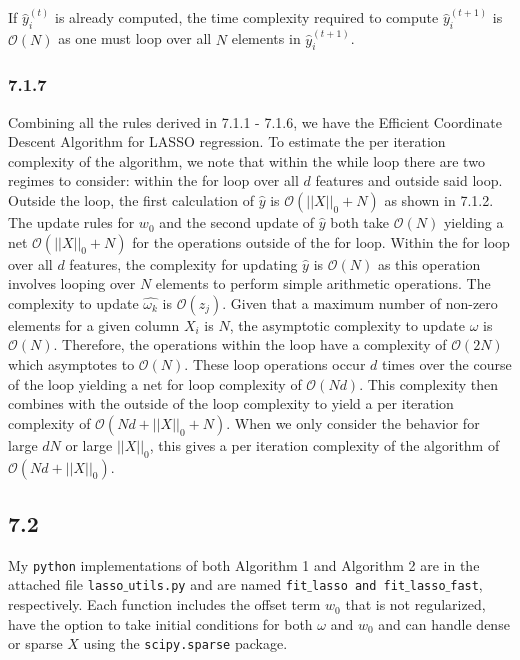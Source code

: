 \documentclass[12pt]{amsart}
\begin{document}
If $\hat{y}_i^{(t)}$ is already computed, the time complexity required to compute $\hat{y}_i^{(t+1)}$ is $\mathcal{O}(N)$ as one must loop over all $N$ elements in $\hat{y}_i^{(t+1)}$.

\subsubsection*{7.1.7}

Combining all the rules derived in 7.1.1 - 7.1.6, we have the Efficient Coordinate Descent Algorithm for LASSO regression.  To estimate the per iteration complexity of the algorithm, we note that within the while loop there are two regimes to consider: within the for loop over all $d$ features and outside said loop.  Outside the loop, the first calculation of $\hat{y}$ is $\mathcal{O}(||X||_0 + N)$ as shown in 7.1.2.  The update rules for $w_0$ and the second update of $\hat{y}$ both take $\mathcal{O}(N)$ yielding a net $\mathcal{O}(||X||_0 + N)$ for the operations outside of the for loop.  Within the for loop over all $d$ features, the complexity for updating $\hat{y}$ is $\mathcal{O}(N)$ as this operation involves looping over $N$ elements to perform simple arithmetic operations.  The complexity to update $\hat{\omega_k}$ is $\mathcal{O}(z_j)$.  Given that a maximum number of non-zero elements for a given column $X_i$ is $N$, the asymptotic complexity to update $\hat{\omega}$ is $\mathcal{O}(N)$.  Therefore, the operations within the loop have a complexity of $\mathcal{O}(2N)$ which asymptotes to $\mathcal{O}(N)$.  These loop operations occur $d$ times over the course of the loop yielding a net for loop complexity of $\mathcal{O}(Nd)$.  This complexity then combines with the outside of the loop complexity to yield a per iteration complexity of $\mathcal{O}(Nd + ||X||_0 + N)$.  When we only consider the behavior for large $dN$ or large $||X||_0$, this gives a per iteration complexity of the algorithm of $\mathcal{O}(Nd + ||X||_0)$.

\subsection*{7.2}

My {\tt python} implementations of both Algorithm 1 and Algorithm 2 are in the attached file {\tt lasso$\_$utils.py} and are named {\tt fit$\_$lasso and fit$\_$lasso$\_$fast}, respectively.  Each function includes the offset term $w_0$ that is not regularized, have the option to take initial conditions for both $\omega$ and $w_0$ and can handle dense or sparse $X$ using the {\tt scipy.sparse} package.
\end{document}
